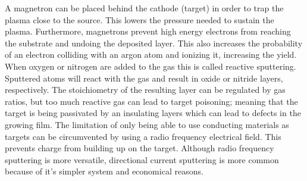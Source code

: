 A magnetron can be placed behind the cathode (target) in order to trap the plasma close to the source. 
This lowers the pressure needed to sustain the plasma. 
Furthermore, magnetrons prevent high energy electrons from reaching the substrate and 
undoing the deposited layer.
This also increases the probability of an electron 
colliding with an argon atom and ionizing it, increasing the yield.
%
When oxygen or nitrogen are added to the gas this is called reactive sputtering.
Sputtered atoms will react with the gas and result in oxide or nitride layers, respectively.
The stoichiometry of the resulting layer can be regulated by gas ratios, but too much reactive gas can lead to target poisoning;
meaning that the target is being passivated by an insulating layers which can lead to defects in the growing film\cite{Kelly2000}. 
%
The limitation of only being able to use conducting materials as targets can be circumvented by using a radio frequency electrical field. 
This prevents charge from building up on the target. \linebreak[2]
Although radio frequency sputtering is more versatile, directional current sputtering is more common because of it's simpler system and economical reasons.

